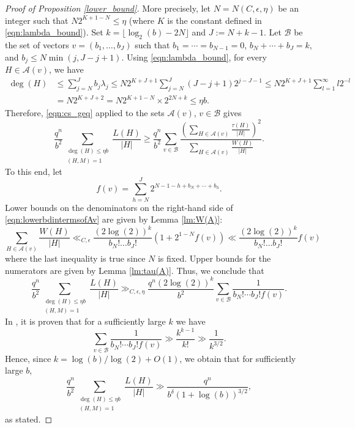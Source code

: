 \documentclass[12pt]{amsart}
\numberwithin{equation}{section}
\theoremstyle{definition}
\theoremstyle{remark}
\begin{document}
\begin{proof}[Proof of Proposition \ref{lower_bound}]
    More precisely, 
    let $N=N(C,\epsilon,\eta)$ be an integer such that $N 2^{K+1-N}  \leq \eta$ (where $K$ is the constant defined in \eqref{eqn:lambda_bound}). Set $k = \lfloor\log_2(b)-2N\rfloor$ and $J := N+k-1$. Let $\mathcal{B}$ be the set of vectors $v = (b_1, \dotsc ,b_J)$ such that $b_1=\cdots =b_{N-1}=0$, $b_N+ \dotsb + b_J=k$, and $b_j \leq N \min(j,J-j+1)$. Using \eqref{eqn:lambda_bound}, for every $H \in \mathcal{A}(v)$, we have
    \begin{align*}
        \deg(H) 
            &\leq \sum_{j=N}^J b_j \lambda_j 
            \leq N2^{K+J+1} \sum_{j=N}^J (J-j+1)2^{j-J-1} \leq   
              N2^{K+J+1}\sum_{l=1}^{\infty} l 2^{-l} \\
        &= N2^{K+J+2} = N2^{K+1-N} \times 2^{2N+k} \leq 
        \eta b.
    \end{align*}
    Therefore, \eqref{eqn:cs_geq} applied to the sets $\mathcal{A}(v)$, $v\in\mathcal{B}$ gives
    \begin{equation}\label{eqn:lowerbdintermsofAv}
        \frac{q^n}{b^2} \sum_{\substack{\deg(H) \leq \eta b \\ (H,M)=1}} \frac{L(H)}{|H|} \geq \frac{q^n}{b^2} \sum_{v \in \mathcal{B}} \frac{\left( \sum_{H \in \mathcal{A}(v)} \frac{\tau(H)}{|H|} \right) ^2}{ \sum_{H \in \mathcal{A}(v)} \frac{W(H)}{|H|} }.
    \end{equation}
    To this end, let
    \[
        f(v) = \sum_{h=N}^J 2^{N-1-h+b_N + \dotsb +b_h}.
    \]
    Lower bounds on the denominators on the right-hand side of \eqref{eqn:lowerbdintermsofAv} are given by Lemma \ref{lm:W(A)}:
    \begin{equation}
        \sum_{H\in \mathcal{A}(v)} \frac{W(H)}{|H|} \ll_{C,\epsilon} \frac{(2\log(2))^k}{b_N!\dots b_J!} (1+2^{1-N} f(v) ) \ll \frac{(2\log(2))^k}{b_N!\dots b_J!} f(v)
    \end{equation}
    where the last inequality is true since $N$ is fixed.
    Upper bounds for the numerators are given by Lemma \ref{lm:tau(A)}. Thus, we conclude that 
    \[
        \frac{q^n}{b^2} \sum_{\substack{\deg(H) \leq \eta b \\ (H,M)=1}} \frac{L(H)}{|H|} 
        \gg_{C,\epsilon,\eta} \frac{q^n (2\log(2))^k}{b^2} \sum_{v \in \mathcal{B}} \frac{1}{b_N! \dotsb b_J! f(v)}.
    \]
    In \cite[Page 8]{ford_H_y_2y}, it is proven that for a sufficiently large $k$ we have
    \[
        \sum_{v \in \mathcal{B}} \frac{1}{b_N! \dotsb b_J! f(v)} \gg \frac{k^{k-1}}{k!} \gg \frac{1}{k^{3/2}}.
    \]
    Hence, since $k = \log(b) / \log(2) + O(1)$, we obtain that for sufficiently large $b$,
    \begin{equation*}
        \frac{q^{n}}{b^2} \sum_{\substack{\deg(H)\leq \eta b \\ (H,M)=1}}  \frac{L(H)}{|H|} \gg \frac{q^n}{b^\delta(1+\log(b))^{3/2}},
    \end{equation*}
    as stated.
\end{proof}
\end{document}
